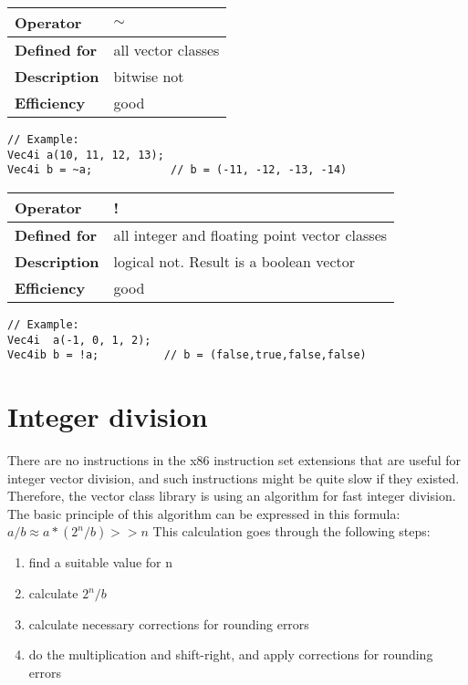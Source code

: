 \documentclass[vcl_manual.tex]{subfiles}
\begin{document}
\begin{tabular}{|p{25mm}|p{100mm}|}
\hline
\bfseries Operator & $\sim$ \\ \hline
\bfseries Defined for & all vector classes \\ \hline
\bfseries Description & bitwise not \\ \hline
\bfseries Efficiency & good \\ \hline
\end{tabular}
\begin{lstlisting}[frame=none]
// Example:
Vec4i a(10, 11, 12, 13);
Vec4i b = ~a;            // b = (-11, -12, -13, -14)
\end{lstlisting}


\begin{tabular}{|p{25mm}|p{100mm}|}
\hline
\bfseries Operator & ! \\ \hline
\bfseries Defined for & all integer and floating point vector classes \\ \hline
\bfseries Description & logical not. Result is a boolean vector \\ \hline
\bfseries Efficiency & good \\ \hline
\end{tabular}
\begin{lstlisting}[frame=none]
// Example:
Vec4i  a(-1, 0, 1, 2);
Vec4ib b = !a;          // b = (false,true,false,false)
\end{lstlisting}


\section{Integer division} \label{IntegerDivision}

There are no instructions in the x86 instruction set extensions that are useful for integer vector division, and such instructions might be quite slow if they existed. Therefore, the vector class library is using an algorithm for fast integer division. The basic principle of this algorithm can be expressed in this formula:
 \newline
	$a / b \approx a * (2^n / b) >> n$ \newline
{}
This calculation goes through the following steps:

\begin{enumerate}
  \item find a suitable value for n
  \item calculate $2^n / b$
  \item calculate necessary corrections for rounding errors
  \item do the multiplication and shift-right, and apply corrections for rounding errors  
\end{enumerate}
\end{document}
